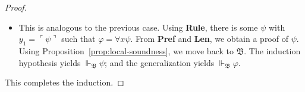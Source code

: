 \documentclass[10pt,a4paper]{amsart}
\newcommand{\Pre}{\textsf{Pref}}
\newcommand{\Prf}{\textsf{Prf}}
\newcommand{\base}[1]{\mathfrak{#1}}
\newcommand{\pa}{\textsf{A}}
\newcommand{\supp}{\Vdash}
\begin{document}
\begin{proof}
\begin{itemize}
\[\]
By the correctness of the encoding (\textbf{Rule}), there is a formula $\psi$ such that
$ y_1=\ulcorner\psi\urcorner$ and $ y_2=\ulcorner\psi\to\varphi\urcorner$. Let
$p_1:=\Pre(p, i+\bar{1})$ and $p_2:=\Pre(p, j+\bar{1})$; by the prefix closure on proofs (\textbf{Pref}), 
\[
\vdash_{\pa} \Prf(p_1,\ulcorner\psi\urcorner)
\quad\text{and}\quad
\vdash_{\pa} \Prf(p_2,\ulcorner\psi\to\varphi\urcorner)
\]
By local soundness (Proposition~\ref{prop:local-soundness}),
\[
\supp_{\base{B}}  \Prf(p_1,\ulcorner\psi\urcorner)
\quad\text{and}\quad
\supp_{\base{B}} \Prf(p_2,\ulcorner\psi\to\varphi\urcorner)
\]
By the length of prefixes ($\textbf{Len}$), the length of $p_1$ and $p_2$ are less than the length of $p$. Applying IH to each, we obtain
$\supp_{\base{B}}  \psi$ and $\supp_{\base{B}} \psi\to\varphi$. The desired result obtains by \emph{modus ponens}.

\item This is analogous to the previous case. Using \textbf{Rule}, there is some $\psi$ with
$y_1=\ulcorner\psi\urcorner$ such that $\varphi=\forall x \psi$.  From \textbf{Pref} and \textbf{Len}, we obtain a 
proof of $\psi$. Using Proposition~\ref{prop:local-soundness}, we move back to $\base{B}$. The induction hypothesis yields $\supp_{\base{B}}\psi$; and the
generalization yields $\supp_{\base{B}}\varphi$.
\end{itemize}
This completes the induction.
\end{proof}
\end{document}
